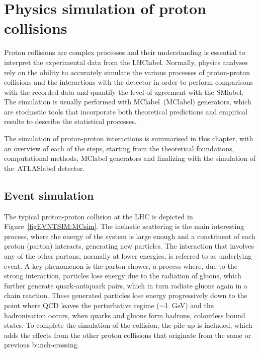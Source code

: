 \chapter{Physics simulation of proton collisions}
\label{chapter:EventSim}

Proton collisions are complex processes and their understanding is essential to interpret the experimental data from the \acrshort{LHClabel}. Normally, physics analyses rely on the ability to accurately simulate the various processes of proton-proton collisions and the interactions with the detector in order to perform comparisons with the recorded data and quantify the level of agreement with the \acrshort{SMlabel}. The simulation is usually performed with \acrlong{MClabel}~(\acrshort{MClabel}) generators, which are stochastic tools that incorporate both theoretical predictions and empirical results to describe the statistical processes.

The simulation of proton-proton interactions is summarised in this chapter, with an overview of each of the steps, starting from the theoretical foundations, computational methods, \acrshort{MClabel} generators and finalizing with the simulation of the~\acrshort{ATLASlabel} detector.

\section{Event simulation}

The typical proton-proton collision at the LHC is depicted in Figure~\ref{figEVNTSIM:MCsim}. The inelastic scattering is the main interesting process, where the energy of the system is large enough and a constituent of each proton (parton) interacts, generating new particles. The interaction that involves any of the other partons, normally at lower energies, is referred to as underlying event. A key phenomenon is the parton shower, a process where, due to the strong interaction, particles lose energy due to the radiation of gluons, which further generate quark-antiquark pairs, which in turn radiate gluons again in a chain reaction. These generated particles lose energy progressively down to the point where \acrshort{QCD} leaves the perturbative regime ($\sim$1~GeV) and the hadronisation occurs, when quarks and gluons form hadrons, colourless bound states. To complete the simulation of the collision, the pile-up is included, which adds the effects from the other proton collisions that originate from the same or previous bunch-crossing.  

